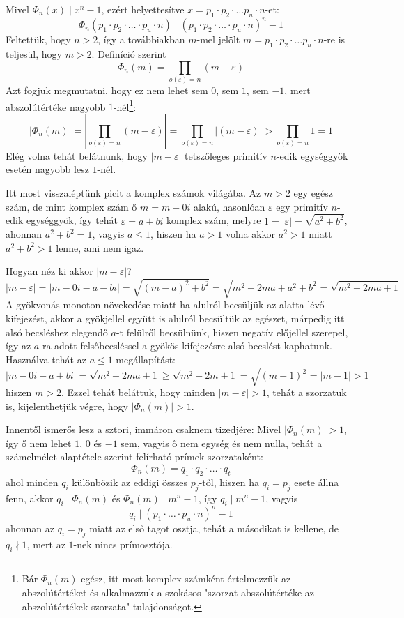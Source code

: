 \documentclass[12pt]{book}
\theoremstyle{plain} %
\theoremstyle{definition} %
\theoremstyle{remark}
\numberwithin{equation}{section}  %
\begin{document}
	Mivel $\Phi_n(x)\mid x^n-1$, ezért helyettesítve $x=p_1\cdot p_2\cdot \ldots p_u\cdot n$-et:
	\[ \Phi_n(p_1\cdot p_2 \cdot \ldots \cdot p_u \cdot n) \mid (p_1\cdot p_2 \cdot \ldots \cdot p_u \cdot n)^n - 1  \]
	Feltettük, hogy $n > 2$, így a továbbiakban $m$-mel jelölt $m=p_1\cdot p_2\cdot \ldots p_u \cdot n$-re is teljesül, hogy $m > 2$. Definíció szerint
	\[ \Phi_n(m) = \prod_{o(\varepsilon) = n} (m-\varepsilon)  \]
	Azt fogjuk megmutatni, hogy ez nem lehet sem $0$, sem $1$, sem $-1$, mert abszolútértéke nagyobb $1$-nél\footnote{Bár $\Phi_n(m)$ egész, itt most komplex számként értelmezzük az abszolútértéket és alkalmazzuk a szokásos "szorzat abszolútértéke az abszolútértékek szorzata" tulajdonságot.}:
	\[ |\Phi_n(m)| = \left|\prod_{o(\varepsilon) = n} (m-\varepsilon)\right| = \prod_{o(\varepsilon) = n} |(m-\varepsilon)| > \prod_{o(\varepsilon) = n} 1 = 1  \]
	Elég volna tehát belátnunk, hogy $|m-\varepsilon|$ tetszőleges primitív $n$-edik egységgyök esetén nagyobb lesz $1$-nél.
	
	Itt most visszaléptünk picit a komplex számok világába. Az $m>2$ egy egész szám, de mint komplex szám ő $m=m-0i$ alakú, hasonlóan $\varepsilon$ egy primitív $n$-edik egységgyök, így tehát  $\varepsilon=a+bi$ komplex szám, melyre $1 = |\varepsilon| = \sqrt{a^2 + b^2}$, ahonnan $a^2+b^2 = 1$, vagyis $a\leq 1$, hiszen ha $a>1$ volna akkor $a^2>1$ miatt $a^2+b^2>1$ lenne, ami nem igaz.
	
	Hogyan néz ki akkor $|m-\varepsilon|$?
	\[ |m-\varepsilon| =  |m-0i - a - bi| = \sqrt{ (m-a)^2 + b^2 } = \sqrt{m^2 - 2ma + a^2 + b^2} = \sqrt{m^2 -2ma + 1} \]
	A gyökvonás monoton növekedése miatt ha alulról becsüljük az alatta lévő kifejezést, akkor a gyökjellel együtt is alulról becsültük az egészet, márpedig itt alsó becsléshez elegendő $a$-t felülről becsülnünk, hiszen negatív előjellel szerepel, így az $a$-ra adott felsőbecsléssel a gyökös kifejezésre alsó becslést kaphatunk. Használva tehát az $a\leq 1$ megállapítást:
	\[ |m-0i - a + bi| = \sqrt{m^2 -2ma + 1} \geq \sqrt{m^2 - 2m + 1} = \sqrt{(m-1)^2} = |m-1| > 1 \]
	hiszen $m > 2$. Ezzel tehát beláttuk, hogy minden $|m-\varepsilon|>1$, tehát a szorzatuk is, kijelenthetjük végre, hogy $|\Phi_n(m)|>1$.
	
	Innentől ismerős lesz a sztori, immáron csaknem tizedjére: Mivel $|\Phi_n(m)|>1$, így ő nem lehet $1$, $0$ és $-1$ sem, vagyis ő nem egység és nem nulla, tehát a számelmélet alaptétele szerint felírható prímek szorzataként:
	\[ \Phi_n(m) = q_1\cdot q_2\cdot \ldots \cdot q_t  \]
	ahol minden $q_i$ különbözik az eddigi összes $p_j$-től, hiszen ha $q_i=p_j$ esete állna fenn, akkor $q_i\mid \Phi_n(m)$ és $\Phi_n(m)\mid m^n-1$, így $q_i\mid m^n-1$, vagyis 
	\[ q_i \mid (p_1\cdot \ldots \cdot p_u \cdot n)^n - 1 \]
	ahonnan az $q_i = p_j$ miatt az első tagot osztja, tehát a másodikat is kellene, de $q_i \nmid 1$, mert az $1$-nek nincs prímosztója.
	
\end{document}
